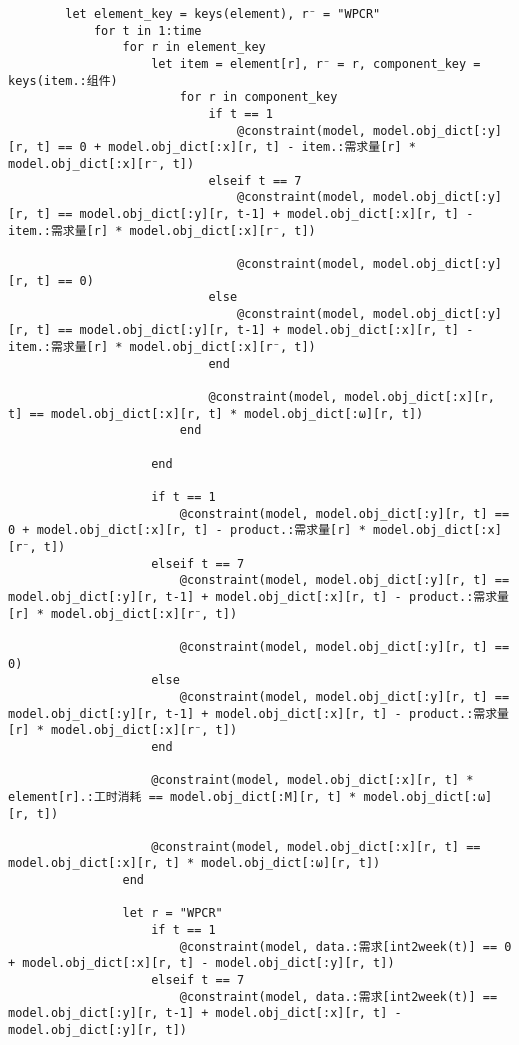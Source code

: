 \begin{appendices}
\begin{lstlisting}
        let element_key = keys(element), r⁻ = "WPCR"
            for t in 1:time
                for r in element_key
                    let item = element[r], r⁻ = r, component_key = keys(item.:组件)
                        for r in component_key
                            if t == 1
                                @constraint(model, model.obj_dict[:y][r, t] == 0 + model.obj_dict[:x][r, t] - item.:需求量[r] * model.obj_dict[:x][r⁻, t])
                            elseif t == 7
                                @constraint(model, model.obj_dict[:y][r, t] == model.obj_dict[:y][r, t-1] + model.obj_dict[:x][r, t] - item.:需求量[r] * model.obj_dict[:x][r⁻, t])

                                @constraint(model, model.obj_dict[:y][r, t] == 0)
                            else
                                @constraint(model, model.obj_dict[:y][r, t] == model.obj_dict[:y][r, t-1] + model.obj_dict[:x][r, t] - item.:需求量[r] * model.obj_dict[:x][r⁻, t])
                            end

                            @constraint(model, model.obj_dict[:x][r, t] == model.obj_dict[:x][r, t] * model.obj_dict[:ω][r, t])
                        end

                    end

                    if t == 1
                        @constraint(model, model.obj_dict[:y][r, t] == 0 + model.obj_dict[:x][r, t] - product.:需求量[r] * model.obj_dict[:x][r⁻, t])
                    elseif t == 7
                        @constraint(model, model.obj_dict[:y][r, t] == model.obj_dict[:y][r, t-1] + model.obj_dict[:x][r, t] - product.:需求量[r] * model.obj_dict[:x][r⁻, t])

                        @constraint(model, model.obj_dict[:y][r, t] == 0)
                    else
                        @constraint(model, model.obj_dict[:y][r, t] == model.obj_dict[:y][r, t-1] + model.obj_dict[:x][r, t] - product.:需求量[r] * model.obj_dict[:x][r⁻, t])
                    end

                    @constraint(model, model.obj_dict[:x][r, t] * element[r].:工时消耗 == model.obj_dict[:M][r, t] * model.obj_dict[:ω][r, t])

                    @constraint(model, model.obj_dict[:x][r, t] == model.obj_dict[:x][r, t] * model.obj_dict[:ω][r, t])
                end

                let r = "WPCR"
                    if t == 1
                        @constraint(model, data.:需求[int2week(t)] == 0 + model.obj_dict[:x][r, t] - model.obj_dict[:y][r, t])
                    elseif t == 7
                        @constraint(model, data.:需求[int2week(t)] == model.obj_dict[:y][r, t-1] + model.obj_dict[:x][r, t] - model.obj_dict[:y][r, t])


\end{lstlisting}
\end{appendices}
